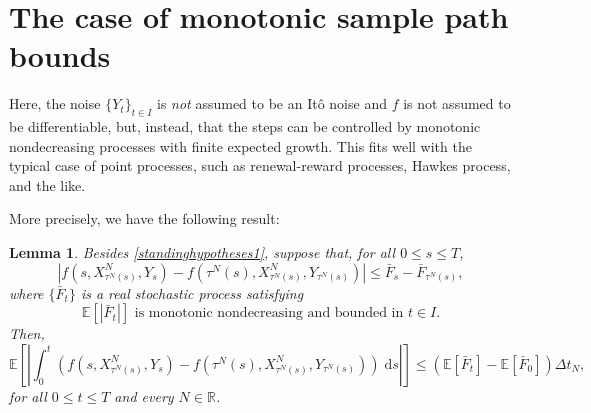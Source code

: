 \documentclass[reqno,12pt]{amsart}
\theoremstyle{plain}%
\newtheorem{lem}{Lemma}[section]
\theoremstyle{definition}
\begin{document}
\section{The case of monotonic sample path bounds}
\label{secmonotonicbound}

Here, the noise $\{Y_t\}_{t\in I}$ is \emph{not} assumed to be an It\^o noise and $f$ is not assumed to be differentiable, but, instead, that the steps can be controlled by monotonic nondecreasing processes with finite expected growth. This fits well with the typical case of point processes, such as renewal-reward processes, Hawkes process, and the like.

More precisely, we have the following result:

\begin{lem}
    \label{lemmonotonicbound}
    Besides \cref{standinghypotheses1}, suppose that, for all $0 \leq s \leq T$,
    \begin{equation}
        \label{stepbound}
          |f(s, X_{\tau^N(s)}^N, Y_s) - f({\tau^N(s)}, X_{\tau^N(s)}^N, Y_{\tau^N(s)})| \leq \bar F_s - \bar F_{\tau^N(s)},
      \end{equation}
      where $\{\bar F_t\}$ is a real stochastic process satisfying
      \begin{equation}
        \label{expectstepmonotonic}
        \mathbb{E}[|\bar F_t|] \textrm{ is monotonic nondecreasing and bounded in } t\in I.
      \end{equation}
      Then,
      \begin{equation}
        \label{expectintfboundbyG}
          \mathbb{E}\left[\left|\int_0^t \left( f(s, X_{\tau^N(s)}^N, Y_s) - f(\tau^N(s), X_{\tau^N(s)}^N, Y_{\tau^N(s)}) \right)\;\mathrm{d}s\right|\right] \leq (\mathbb{E}[\bar F_t] - \mathbb{E}[\bar F_0])\Delta t_N,
      \end{equation}
      for all $0 \leq t \leq T$ and every $N\in \mathbb{R}$.
\end{lem}
\end{document}
